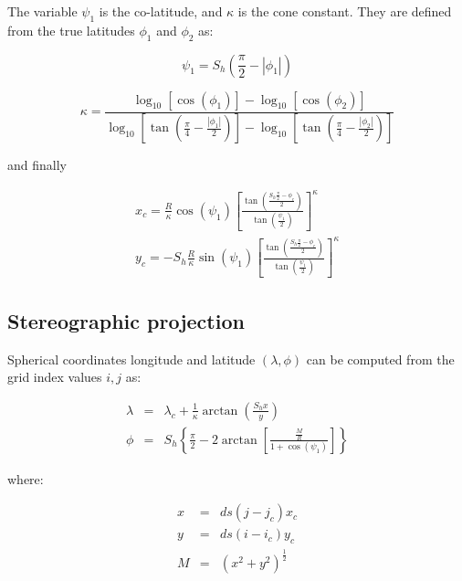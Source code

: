 The variable $\psi_1$ is the co-latitude, and $\kappa$ is the cone constant.
They are defined from the true latitudes $\phi_1$ and $\phi_2$ as:

\begin{equation}
  \psi_1 = S_h \left(\frac{\pi}{2} - |\phi_1| \right)
\end{equation}

\begin{equation}
  \kappa = \frac{\log_{10}\left[\cos(\phi_1)\right] - 
                 \log_{10}\left[\cos(\phi_2)\right]}
                {\log_{10}\left[\tan(\frac{\pi}{4}-\frac{|\phi_1|}{2})\right]-
                 \log_{10}\left[\tan(\frac{\pi}{4}-\frac{|\phi_2|}{2})\right]}
\end{equation}

and finally

\begin{eqnarray}
  x_c = \frac{R}{\kappa} \cos(\psi_1) \left[\frac{\tan\left(
         \frac{S_h \frac{\pi}{2}-\phi_c}{2}\right)}
         {\tan\left(\frac{\psi_1}{2}\right)} \right]^\kappa \\
  y_c = -S_h \frac{R}{\kappa} \sin(\psi_1) \left[\frac{\tan\left(
         \frac{S_h \frac{\pi}{2}-\phi_c}{2}\right)}
         {\tan\left(\frac{\psi_1}{2}\right)} \right]^\kappa
\end{eqnarray}

\subsection{Stereographic projection}

Spherical coordinates longitude and latitude $(\lambda, \phi)$ can be computed
from the grid index values $i,j$ as:

\begin{eqnarray}
  \lambda &=& \lambda_c + 
         \frac{1}{\kappa}\arctan\left(\frac{S_h x}{y}\right) \\
  \phi &=& S_h \left\{ \frac{\pi}{2} - 
              2 \arctan\left[\frac{\frac{M}{R}}{1+\cos(\psi_1)}\right]
              \right\}
\end{eqnarray}

where:

\begin{eqnarray}
  x &=& ds \left(j-j_c\right) x_c \\
  y &=& ds \left(i-i_c\right) y_c \\
  M &=& \left(x^2+y^2\right)^{\frac{1}{2}} \\
\end{eqnarray}

